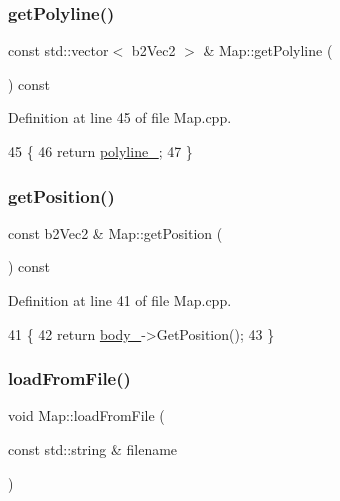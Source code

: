 \subsubsection{\texorpdfstring{get\+Polyline()}{getPolyline()}}
{\footnotesize\ttfamily const std\+::vector$<$ b2\+Vec2 $>$ \& Map\+::get\+Polyline (\begin{DoxyParamCaption}{ }\end{DoxyParamCaption}) const}



Definition at line 45 of file Map.\+cpp.


\begin{DoxyCode}
45                                                 \{
46     \textcolor{keywordflow}{return} \hyperlink{classMap_a6bb2e5bde1854c9ceb4ad7d0349aa878}{polyline\_};
47 \}
\end{DoxyCode}
\mbox{\label{classMap_a09c9d761e0d6960ab6baf51310e6b28e}} 
\subsubsection{\texorpdfstring{get\+Position()}{getPosition()}}
{\footnotesize\ttfamily const b2\+Vec2 \& Map\+::get\+Position (\begin{DoxyParamCaption}{ }\end{DoxyParamCaption}) const}



Definition at line 41 of file Map.\+cpp.


\begin{DoxyCode}
41                                      \{
42     \textcolor{keywordflow}{return} \hyperlink{classMap_a195872fd7eb8c84db43a75bf27a6a2f2}{body\_}->GetPosition();
43 \}
\end{DoxyCode}
\mbox{\label{classMap_af2fd3dfd35ca7a85544a6c083e542f2f}} 
\subsubsection{\texorpdfstring{load\+From\+File()}{loadFromFile()}}
{\footnotesize\ttfamily void Map\+::load\+From\+File (\begin{DoxyParamCaption}\item[{const std\+::string \&}]{filename }\end{DoxyParamCaption})\hspace{0.3cm}{\ttfamily [private]}}



